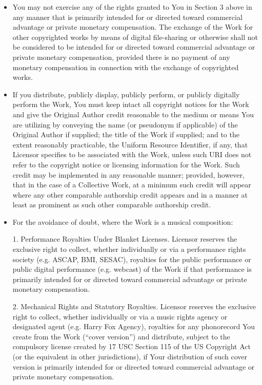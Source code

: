 \documentclass{article}
\begin{document}
\begin{itemize}
\begin{itemize}
\item You may not exercise any of the rights granted to You in Section
3 above in any manner that is primarily intended for or directed
toward commercial advantage or private monetary compensation.  The
exchange of the Work for other copyrighted works by means of digital
file-sharing or otherwise shall not be considered to be intended for
or directed toward commercial advantage or private monetary
compensation, provided there is no payment of any monetary
compensation in connection with the exchange of copyrighted works.

\item If you distribute, publicly display, publicly perform, or
publicly digitally perform the Work, You must keep intact all
copyright notices for the Work and give the Original Author credit
reasonable to the medium or means You are utilizing by conveying the
name (or pseudonym if applicable) of the Original Author if supplied;
the title of the Work if supplied; and to the extent reasonably
practicable, the Uniform Resource Identifier, if any, that Licensor
specifies to be associated with the Work, unless such URI does not
refer to the copyright notice or licensing information for the Work. 
Such credit may be implemented in any reasonable manner; provided,
however, that in the case of a Collective Work, at a minimum such
credit will appear where any other comparable authorship credit
appears and in a manner at least as prominent as such other comparable
authorship credit.

\item

For the avoidance of doubt, where the Work is a musical composition:

1.  Performance Royalties Under Blanket Licenses.  Licensor reserves
the exclusive right to collect, whether individually or via a
performance rights society (e.g.  ASCAP, BMI, SESAC), royalties for
the public performance or public digital performance (e.g.  webcast)
of the Work if that performance is primarily intended for or directed
toward commercial advantage or private monetary compensation.

2.  Mechanical Rights and Statutory Royalties.  Licensor reserves the
exclusive right to collect, whether individually or via a music rights
agency or designated agent (e.g.  Harry Fox Agency), royalties for any
phonorecord You create from the Work (``cover version'') and
distribute, subject to the compulsory license created by 17 USC
Section 115 of the US Copyright Act (or the equivalent in other
jurisdictions), if Your distribution of such cover version is
primarily intended for or directed toward commercial advantage or
private monetary compensation.


\end{itemize}
\end{itemize}
\end{document}
